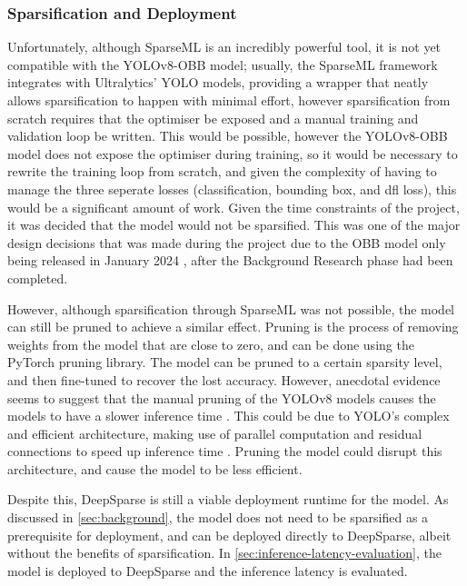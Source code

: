 \subsubsection{Sparsification and Deployment}
\label{sec:sparsification-deployment}
Unfortunately, although SparseML is an incredibly powerful tool, it is not yet compatible with the YOLOv8-OBB model; usually, the SparseML framework integrates with Ultralytics' YOLO models, providing a wrapper that neatly allows sparsification to happen with minimal effort, however sparsification from scratch requires that the optimiser be exposed and a manual training and validation loop be written. This would be possible, however the YOLOv8-OBB model does not expose the optimiser during training, so it would be necessary to rewrite the training loop from scratch, and given the complexity of having to manage the three seperate losses (classification, bounding box, and dfl loss), this would be a significant amount of work. Given the time constraints of the project, it was decided that the model would not be sparsified. This was one of the major design decisions that was made during the project due to the OBB model only being released in January 2024 \cite{obbrelease}, after the Background Research phase had been completed. 

However, although sparsification through SparseML was not possible, the model can still be pruned to achieve a similar effect. Pruning is the process of removing weights from the model that are close to zero, and can be done using the PyTorch pruning library. The model can be pruned to a certain sparsity level, and then fine-tuned to recover the lost accuracy. However, anecdotal evidence seems to suggest that the manual pruning of the YOLOv8 models causes the models to have a slower inference time \cite{pruning}. This could be due to YOLO's complex and efficient architecture, making use of parallel computation and residual connections to speed up inference time \cite{yolo}. Pruning the model could disrupt this architecture, and cause the model to be less efficient.

Despite this, DeepSparse \cite{deepsparse} is still a viable deployment runtime for the model. As discussed in \autoref{sec:background}, the model does not need to be sparsified as a prerequisite for deployment, and can be deployed directly to DeepSparse, albeit without the benefits of sparsification. In \autoref{sec:inference-latency-evaluation}, the model is deployed to DeepSparse and the inference latency is evaluated.

